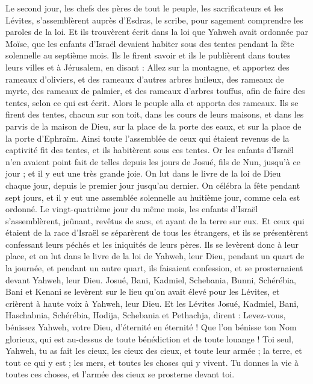 \begin{multicols}{2}
Le second jour, les chefs des pères de tout le peuple, les sacrificateurs et les Lévites, s'assemblèrent auprès d’Esdras, le scribe, pour sagement comprendre les paroles de la loi.
Et ils trouvèrent écrit dans la loi que Yahweh avait ordonnée par Moïse, que les enfants d'Israël devaient habiter sous des tentes pendant la fête solennelle au septième mois.
Ils le firent savoir et ils le publièrent dans toutes leurs villes et à Jérusalem, en disant : Allez sur la montagne, et apportez des rameaux d'oliviers, et des rameaux d'autres arbres huileux, des rameaux de myrte, des rameaux de palmier, et des rameaux d’arbres touffus, afin de faire des tentes, selon ce qui est écrit.
Alors le peuple alla et apporta des rameaux. Ils se firent des tentes, chacun sur son toit, dans les cours de leurs maisons, et dans les parvis de la maison de Dieu, sur la place de la porte des eaux, et sur la place de la porte d'Ephraïm.
Ainsi toute l'assemblée de ceux qui étaient revenus de la captivité fit des tentes, et ils habitèrent sous ces tentes. Or les enfants d'Israël n'en avaient point fait de telles depuis les jours de Josué, fils de Nun, jusqu'à ce jour ; et il y eut une très grande joie.
On lut dans le livre de la loi de Dieu chaque jour, depuis le premier jour jusqu'au dernier. On célébra la fête pendant sept jours, et il y eut une assemblée solennelle au huitième jour, comme cela est ordonné.
\VerseOne{}Le vingt-quatrième jour du même mois, les enfants d'Israël s'assemblèrent, jeûnant, revêtus de sacs, et ayant de la terre sur eux.
Et ceux qui étaient de la race d'Israël se séparèrent de tous les étrangers, et ils se présentèrent confessant leurs péchés et les iniquités de leurs pères.
Ils se levèrent donc à leur place, et on lut dans le livre de la loi de Yahweh, leur Dieu, pendant un quart de la journée, et pendant un autre quart, ils faisaient confession, et se prosternaient devant Yahweh, leur Dieu.
Josué, Bani, Kadmiel, Schebania, Bunni, Schérébia, Bani et Kenani se levèrent sur le lieu qu'on avait élevé pour les Lévites, et crièrent à haute voix à Yahweh, leur Dieu.
Et les Lévites Josué, Kadmiel, Bani, Haschabnia, Schérébia, Hodija, Schebania et Pethachja, dirent : Levez-vous, bénissez Yahweh, votre Dieu, d'éternité en éternité ! Que l’on bénisse ton Nom glorieux, qui est au-dessus de toute bénédiction et de toute louange !
Toi seul, Yahweh, tu as fait les cieux, les cieux des cieux, et toute leur armée ; la terre, et tout ce qui y est ; les mers, et toutes les choses qui y vivent. Tu donnes la vie à toutes ces choses, et l'armée des cieux se prosterne devant toi.

\end{multicols}
